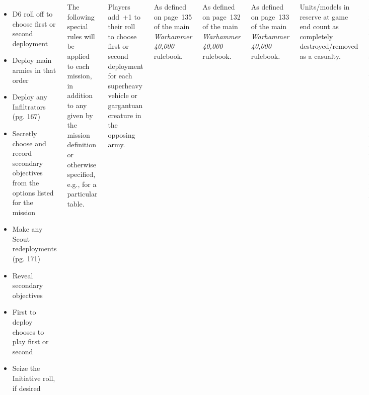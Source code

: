 \begin{columns}
\begin{itemize}
\item D6 roll off to choose first or second deployment

\item Deploy main armies in that order

\item Deploy any Infiltrators (pg. 167)

\item Secretly choose and record secondary objectives from the options
  listed for the mission

\item Make any Scout redeployments (pg. 171)

\item Reveal secondary objectives

\item First to deploy chooses to play first or second

\item Seize the Initiative roll, if desired

\end{itemize}

\columnbreak

%

The following special rules will be applied to each mission, in
addition to any given by the mission definition or otherwise
specified, e.g., for a particular table.

  Players add~+1 to their roll to
choose first or second deployment for each superheavy vehicle or
gargantuan creature in the opposing army.

 As defined on page~135 of the main
\emph{Warhammer 40,000} rulebook.

 As defined on page~132 of
the main \emph{Warhammer 40,000} rulebook.

 As defined on page~133 of
the main \emph{Warhammer 40,000} rulebook.

  Units/models in reserve at game end count
as completely destroyed/removed as a casualty.

%

Match results are determined by scoring primary, secondary, and
tertiary objectives as given for each mission.  Any unit or faction
specific rules granting victory points \emph{to a player's opponent}
also apply.


\end{columns}
